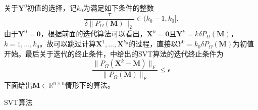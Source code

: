 关于$\mathbf{Y}^0$初值的选择，记$k_0$为满足如下条件的整数
\begin{equation*}
    \frac{\tau}{\delta\|P_\Omega(\mathbf{M})\|_2}\in (k_0-1, k_0].
\end{equation*}
由于$\mathbf{Y}^0 = \mathbf{0}$，根据前面的迭代算法可以看出，$\mathbf{X}^k = \mathbf{0}$且$\mathbf{Y}^k = k\delta P_{\Omega}(\mathbf{M})$，$k = 1,\dots,k_0$。故可以跳过计算$\mathbf{X}^1,\dots,\mathbf{X}^{k_0}$的过程，直接以$Y^0 = k_0\delta P_\Omega(\mathbf{M})$为初值开始。最后关于迭代的终止条件，\cite{cai2010singular}中给出的SVT算法的迭代终止条件为
\begin{equation*}
    \frac{\|P_{\Omega}(\mathbf{X}^k - \mathbf{M})\|_F}{\|P_{\Omega}(\mathbf{M})\|_F} \leq \epsilon
\end{equation*}
下面给出$\mathbf{M}\in \mathbb{R}^{n\times n}$情形下的算法。

\begin{algorithm}
\caption{SVT算法} 
\label{alg3}
\begin{algorithmic}[1]
\REPEAT
{}
\ENDIF
{}
\ENDFOR
{}
\end{algorithmic}
\end{algorithm}